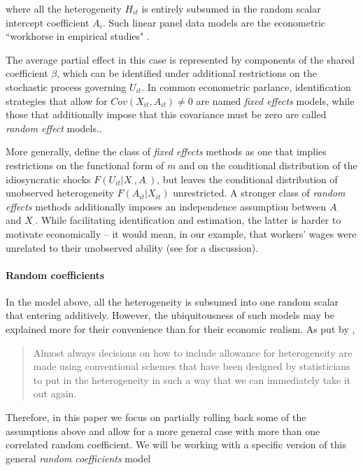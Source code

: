 \noindent where all the heterogeneity $H_{it}$ is entirely subsumed in the random scalar intercept coefficient $A_{i}$. Such linear panel data models are the econometric ``workhorse in empirical studies" \citet{wooldridge2005fixed}.


The average partial effect in this case is represented by components of the shared coefficient $\beta$, which can be identified under additional restrictions on the stochastic process governing $U_{it}$. In common econometric parlance, identification strategies that allow for $Cov(X_{it}, A_{it}) \neq 0$ are named \emph{fixed effects} models, while those that additionally impose that this covariance must be zero are called \emph{random effect} models.\citet{wooldridge2010econometric, arellano2003panel}.

More generally, \cite{graham2012identification} define the class of \emph{fixed effects} methods as one that implies restrictions on the functional form of $m$ and on the conditional distribution of the idiosyncratic shocks $F(U_{it}|X_{\cdot}, A_{\cdot})$, but leaves the conditional distribution of unobserved heterogeneity $F(A_{it}|X_{it})$ unrestricted. A stronger class of \emph{random effects} methods additionally imposes an independence assumption between $A_{\cdot}$ and $X_{\cdot}$. While facilitating identification and estimation, the latter is harder to motivate economically -- it would mean, in our example, that workers' wages were unrelated to their unobserved ability (see \cite{griliches1977estimating} for a discussion).

\paragraph{Random coefficients} In the model above, all the heterogeneity is subsumed into one random scalar that entering additively. However, the ubiquitousness of such models may be explained more for their convenience than for their economic realism. As put by \citet[~p.11]{browning2007heterogeneity},

\begin{quote}
\singlespacing
Almost always decisions on how to include allowance for heterogeneity are made using conventional schemes that have been designed by statisticians to put in the heterogeneity in such a way that we can immediately take it out again. 
\end{quote}

Therefore, in this paper we focus on partially rolling back some of the assumptions above and allow for a more general case with more than one correlated random coefficient. We will be working with a specific version of this general \emph{random coefficients} model

